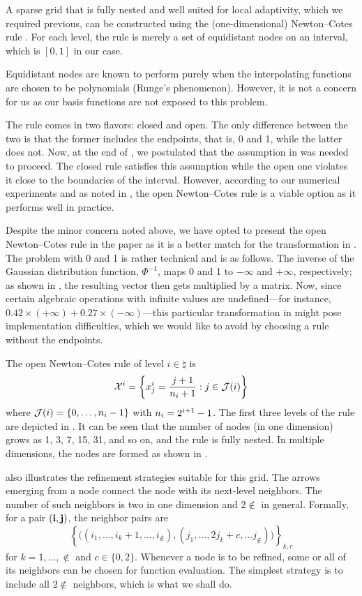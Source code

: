 A sparse grid that is fully nested and well suited for local adaptivity, which
we required previous, can be constructed using the (one-dimensional)
Newton--Cotes rule \cite{klimke2006, ma2009}. For each level, the rule is merely
a set of equidistant nodes on an interval, which is $[0, 1]$ in our case.

\begin{remark}
Equidistant nodes are known to perform purely when the interpolating functions
are chosen to be polynomials (Runge's phenomenon). However, it is not a concern
for us as our basis functions are not exposed to this problem.
\end{remark}

The rule comes in two flavors: closed and open. The only difference between the
two is that the former includes the endpoints, that is, 0 and 1, while the
latter does not. Now, at the end of , we postulated that
the assumption in  was needed to proceed. The closed rule
satisfies this assumption while the open one violates it close to the boundaries
of the interval. However, according to our numerical experiments and as noted in
\cite{klimke2006}, the open Newton--Cotes rule is a viable option as it performs
well in practice.

Despite the minor concern noted above, we have opted to present the open
Newton--Cotes rule in the paper as it is a better match for the transformation
in . The problem with 0 and 1 is rather technical and is as
follows. The inverse of the Gaussian distribution function, $\Phi^{-1}$, maps 0
and 1 to $-\infty$ and $+\infty$, respectively; as shown in
, the resulting vector then gets multiplied by a matrix.
Now, since certain algebraic operations with infinite values are undefined---for
instance, $0.42 \times (+\infty) + 0.27 \times (-\infty)$---this particular
transformation in  might pose implementation difficulties,
which we would like to avoid by choosing a rule without the endpoints.


The open Newton--Cotes rule of level $i \in \natural$ is
\[
  \mathcal{X}^i = \left\{ x^i_j = \frac{j + 1}{n_i + 1}: j \in \mathcal{J}(i) \right\}
\]
where $\mathcal{J}(i) = \left\{ 0, \dots, n_i - 1 \right\}$ with $n_i = 2^{i + 1} -
1$. The first three levels of the rule are depicted in . It can be
seen that the number of nodes (in one dimension) grows as 1, 3, 7, 15, 31, and
so on, and the rule is fully nested. In multiple dimensions, the nodes are
formed as shown in .

 also illustrates the refinement strategies suitable for this grid.
The arrows emerging from a node connect the node with its next-level neighbors.
The number of such neighbors is two in one dimension and $2 \nin$ in general.
Formally, for a pair $(\mathbf{i}, \mathbf{j})$, the neighbor pairs are
\[
  \left\{ \Big( (i_1, \dots, i_k + 1, \dots, i_\nin), (j_1, \dots, 2 j_k + c, \dots j_\nin) \Big) \right\}_{k, c}
\]
for $k = 1, \dots, \nin$ and $c \in \{ 0, 2 \}$. Whenever a node is to be
refined, some or all of its neighbors can be chosen for function evaluation. The
simplest strategy is to include all $2 \nin$ neighbors, which is what we shall
do.
